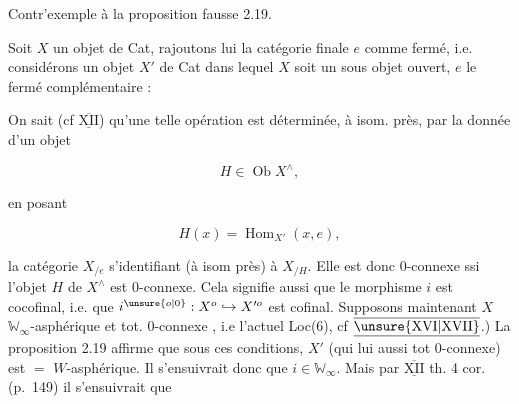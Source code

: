 
 Contr'exemple à la proposition fausse 2.19.

Soit $X$ un objet de Cat, rajoutons lui  la catégorie finale $e$ comme fermé, i.e. considérons un objet $X'$ de Cat dans lequel $X$ soit un sous objet ouvert, $e$ le fermé complémentaire :


On sait (cf $\underline{\overline{\mathrm{XII}}}$) qu'une telle opération est déterminée, à isom. près, par la donnée d'un objet

\[
H\in\operatorname{Ob}X^\wedge,
\]

en posant

\[
H(x)=\operatorname{Hom}_{X'}(x,e),
\]

la catégorie $X_{/e}$ s'identifiant (à isom près) à $X_{/H}$. Elle est donc $0$-connexe ssi l'objet $H$ de $X^\wedge$ est $0$-connexe. Cela signifie aussi que le morphisme $i$ est cocofinal, i.e. que $i^{\unsure{o|0}}:X^o\hookrightarrow X'^{o}$ est cofinal. Supposons maintenant $X$ $\mathbb W_\infty$-asphérique et tot. $0$-connexe , i.e l'actuel Loc(6), cf $\underline{\overline{\unsure{\mathrm{XVI}|\mathrm{XVII}}}}$.) La proposition 2.19 affirme que sous ces conditions, $X'$ (qui  lui aussi tot $0$-connexe) est $=$ $W$-asphérique. Il s'ensuivrait  donc que $i\in\mathbb W_\infty$. Mais par $\underline{\overline{\mathrm{XII}}}$ th. 4 cor.  (p.~149) il s'ensuivrait que

